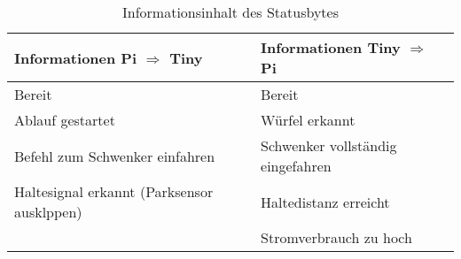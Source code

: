 \documentclass[../../main.tex]{subfiles}
\begin{document}
        \begin{table}[H] \centering
            \begin{tabular}{|l|l|}
            \hline
            \textbf{Informationen Pi $\Rightarrow$ Tiny} & \textbf{Informationen Tiny $\Rightarrow$ Pi} \\ \hline
            Bereit                                       & Bereit                                       \\ \hline
            Ablauf gestartet                             & Würfel erkannt                               \\ \hline
            Befehl zum Schwenker einfahren               & Schwenker vollständig eingefahren            \\ \hline
            Haltesignal erkannt (Parksensor ausklppen)   & Haltedistanz erreicht                        \\ \hline
                                                         & Stromverbrauch zu hoch                       \\ \hline
            \end{tabular}
            \caption{Informationsinhalt des Statusbytes}
            \label{tab:statusInfo}

            \end{table}

    
\end{document}
